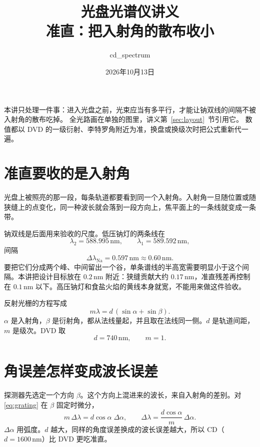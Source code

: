 \documentclass[a4paper,11pt]{ctexart}
\title{\bfseries 光盘光谱仪讲义\\[0.55em]
\large 准直：把入射角的散布收小}
\author{cd\_spectrum}
\date{2026年10月13日}
\begin{document}
\maketitle
\thispagestyle{empty}
\begin{center}
\parbox{0.92\textwidth}{\footnotesize
本讲只处理一件事：进入光盘之前，光束应当有多平行，才能让钠双线的间隔不被入射角的散布吃掉。
全光路画在单独的图里，讲义第~\ref{sec:layout}~节引用它。
数值都以 DVD 的一级衍射、李特罗角附近为准，换盘或换级次时把公式重新代一遍。}
\end{center}
\vspace{0.6em}
\tableofcontents
\vspace{0.8em}

\section{准直要收的是入射角}
\label{sec:why}

光盘上被照亮的那一段，每条轨道都要看到同一个入射角。入射角一旦随位置或随狭缝上的点变化，同一种波长就会落到一段方向上，焦平面上的一条线就变成一条带。

钠双线是后面用来验收的尺度。低压钠灯的两条线在
\[
\lambda_2=588.995\,\mathrm{nm},\qquad \lambda_1=589.592\,\mathrm{nm},
\]
间隔
\[
\Delta\lambda_{\mathrm{Na}}=0.597\,\mathrm{nm}\approx 0.60\,\mathrm{nm}.
\]
要把它们分成两个峰、中间留出一个谷，单条谱线的半高宽需要明显小于这个间隔。本讲把设计目标放在 \(0.2\,\mathrm{nm}\) 附近：狭缝贡献大约 \(0.17\,\mathrm{nm}\)，准直残差再控制在 \(0.1\,\mathrm{nm}\) 以下。高压钠灯和食盐火焰的黄线本身就宽，不能用来做这件验收。

反射光栅的方程写成
\begin{equation}
\label{eq:grating}
m\lambda = d\,(\sin\alpha+\sin\beta).
\end{equation}
\(\alpha\) 是入射角，\(\beta\) 是衍射角，都从法线量起，并且取在法线同一侧。\(d\) 是轨道间距，\(m\) 是级次。DVD 取
\[
d=740\,\mathrm{nm},\qquad m=1.
\]

\section{角误差怎样变成波长误差}
\label{sec:angle}

探测器先选定一个方向 \(\beta\)。这个方向上混进来的波长，来自入射角的差别。对\eqref{eq:grating} 在 \(\beta\) 固定时微分，
\begin{equation}
\label{eq:dlambda}
m\,\Delta\lambda = d\cos\alpha\;\Delta\alpha,
\qquad
\Delta\lambda = \frac{d\cos\alpha}{m}\,\Delta\alpha.
\end{equation}
\(\Delta\alpha\) 用弧度。\(d\) 越大，同样的角度误差换成的波长误差越大，所以 CD（\(d=1600\,\mathrm{nm}\)）比 DVD 更吃准直。
\end{document}

